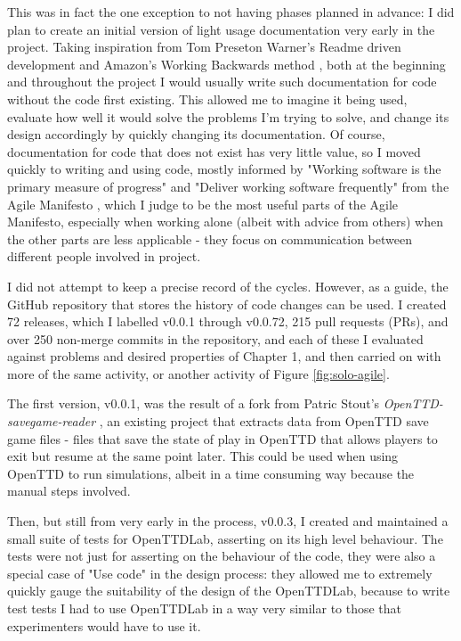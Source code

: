 \documentclass[logo,msc,dsti]{style/infthesis}    %
\begin{document}
{This was in fact the one exception to not having phases planned in advance: I did plan to create an initial version of light usage documentation very early in the project. Taking inspiration from Tom Preseton Warner's Readme driven development \cite{ReadmeDrivenDevelopment} and Amazon's Working Backwards method \cite{bryar2021working}, both at the beginning and throughout the project I would usually write such documentation for code without the code first existing. This allowed me to imagine it being used, evaluate how well it would solve the problems I'm trying to solve, and change its design accordingly by quickly changing its documentation. Of course, documentation for code that does not exist has very little value, so I moved quickly to writing and using code, mostly informed by "Working software is the primary measure of progress" and "Deliver working software frequently" from the Agile Manifesto \cite{beck2001manifesto}, which I judge to be the most useful parts of the Agile Manifesto, especially when working alone (albeit with advice from others) when the other parts are less applicable - they focus on communication between different people involved in project.

I did not attempt to keep a precise record of the cycles. However, as a guide, the GitHub repository that stores the history of code changes can be used. I created 72 releases, which I labelled v0.0.1 through v0.0.72, 215 pull requests (PRs), and over 250 non-merge commits in the repository, and each of these I evaluated against problems and desired properties of Chapter 1, and then carried on with more of the same activity, or another activity of Figure \ref{fig:solo-agile}.

The first version, v0.0.1, was the result of a fork from Patric Stout's \emph{OpenTTD-savegame-reader} \cite{Stout2024}, an existing project that extracts data from OpenTTD save game files - files that save the state of play in OpenTTD that allows players to exit but resume at the same point later. This could be used when using OpenTTD to run simulations, albeit in a time consuming way because the manual steps involved.

Then, but still from very early in the process, v0.0.3, I created and maintained a small suite of tests for OpenTTDLab, asserting on its high level behaviour. The tests were not just for asserting on the behaviour of the code, they were also a special case of "Use code" in the design process: they allowed me to extremely quickly gauge the suitability of the design of the OpenTTDLab, because to write test tests I had to use OpenTTDLab in a way very similar to those that experimenters would have to use it.

}
\end{document}
